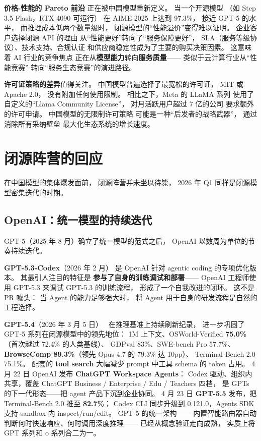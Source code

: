 \textbf{价格-性能的 Pareto 前沿}
正在被中国模型重新定义。
当一个开源模型
（如 Step 3.5 Flash，RTX 4090 可运行）
在 AIME 2025 上达到 97.3\%，
接近 GPT-5 的水平，
而推理成本低两个数量级时，
闭源模型的“性能溢价”变得难以证明。
企业客户选择闭源 API 的理由
从“性能更好”转向了“服务保障更好”，
SLA（服务等级协议）、技术支持、合规认证
和供应商稳定性成为了主要的购买决策因素。
这意味着 AI 行业的竞争焦点
正在从\textbf{模型能力}转向\textbf{服务质量}——
类似于云计算行业从“性能竞赛”
转向“服务生态竞赛”的演进路径。

\textbf{许可证策略的差异}值得关注。
中国模型普遍选择了最宽松的许可证，
MIT 或 Apache 2.0，
没有附加任何使用限制。
相比之下，Meta 的 LLaMA 系列
使用了自定义的“Llama Community License”，
对月活跃用户超过 7 亿的公司
要求额外的许可申请。
中国模型的无限制许可策略
可能是一种“后发者的战略武器”，
通过消除所有采纳壁垒
最大化生态系统的增长速度。


\section{闭源阵营的回应}
\label{sec:closed-source-response}

在中国模型的集体爆发面前，
闭源阵营并未坐以待毙，
2026 年 Q1 同样是闭源模型密集迭代的时期。

\subsection{OpenAI：统一模型的持续迭代}

GPT-5（2025 年 8 月）确立了统一模型的范式之后，
OpenAI 以数周为单位的节奏持续迭代。

\textbf{GPT-5.3-Codex}（2026 年 2 月）
是 OpenAI 针对 agentic coding 的专项优化版本。
其最引人注目的特征是
\textbf{参与了自身的训练调试和部署}——
OpenAI 工程师使用 GPT-5.3 来调试 GPT-5.3 的训练流程，
形成了一个自我改进的闭环。
这不是 PR 噱头：
当 Agent 的能力足够强大时，
将 Agent 用于自身的研发流程是自然的工程选择。

\textbf{GPT-5.4}（2026 年 3 月 5 日）~\cite{openaigpt54}
在推理基准上持续刷新纪录，
进一步巩固了 GPT-5 系列在闭源模型中的领先地位：
1M 上下文、OSWorld-Verified \textbf{75.0\%}（首次越过 72.4\% 的人类基线）、
GDPval 83\%、SWE-bench Pro 57.7\%、
\textbf{BrowseComp 89.3\%}（领先 Opus 4.7 的 79.3\% 达 10pp）、
Terminal-Bench 2.0 75.1\%。
配套的 \textbf{tool search} 大幅减少 prompt 中工具 schema 的 token 占用。
4 月 22 日 OpenAI 发布 \textbf{ChatGPT Workspace Agents}：
Codex 驱动、组织内共享，覆盖 ChatGPT Business / Enterprise / Edu / Teachers 四档，
是 GPTs 的下一代形态——把 agent 产品下沉到企业协同。
4 月 23 日 \textbf{GPT-5.5} 发布，把 Terminal-Bench 2.0 推至 \textbf{82.7\%}；
Codex CLI 同步升级到 0.121.0，Agents SDK 支持 sandbox 内 inspect/run/edit。
GPT-5 的统一架构——
内置智能路由器自动判断何时快速响应、何时调用深度推理——
已经从概念验证走向成熟，
实质上将 GPT 系列和 o 系列合二为一。

